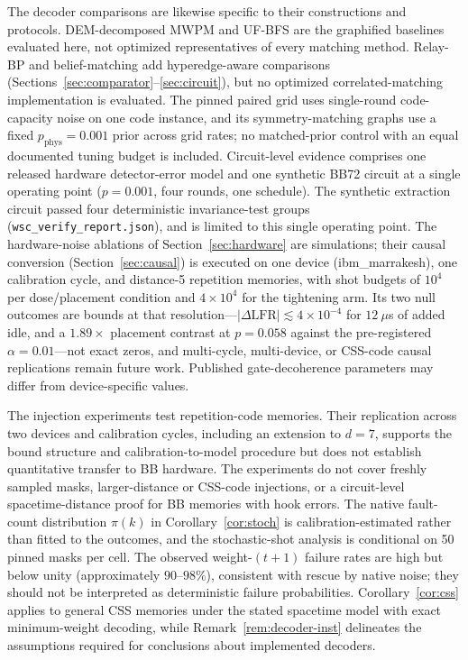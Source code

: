 \documentclass[pdflatex,sn-mathphys-num]{sn-jnl}
\theoremstyle{thmstyleone}
\theoremstyle{thmstyletwo}
\theoremstyle{thmstylethree}
\begin{document}
The decoder comparisons are likewise specific to their constructions and protocols. DEM-decomposed MWPM and UF-BFS are the graphified baselines evaluated here, not optimized representatives of every matching method. Relay-BP and belief-matching add hyperedge-aware comparisons (Sections~\ref{sec:comparator}--\ref{sec:circuit}), but no optimized correlated-matching implementation is evaluated. The pinned paired grid uses single-round code-capacity noise on one code instance, and its symmetry-matching graphs use a fixed $p_{\mathrm{phys}}=0.001$ prior across grid rates; no matched-prior control with an equal documented tuning budget is included. Circuit-level evidence comprises one released hardware detector-error model and one synthetic BB72 circuit at a single operating point ($p=0.001$, four rounds, one schedule). The synthetic extraction circuit passed four deterministic invariance-test groups (\texttt{wsc\_verify\_report.json}), and is limited to this single operating point. The hardware-noise ablations of Section~\ref{sec:hardware} are simulations; their causal conversion (Section~\ref{sec:causal}) is executed on one device (ibm\_marrakesh), one calibration cycle, and distance-5 repetition memories, with shot budgets of $10^{4}$ per dose/placement condition and $4\times10^{4}$ for the tightening arm. Its two null outcomes are bounds at that resolution---$|\Delta\mathrm{LFR}|\lesssim4\times10^{-4}$ for $12~\mu$s of added idle, and a $1.89\times$ placement contrast at $p=0.058$ against the pre-registered $\alpha=0.01$---not exact zeros, and multi-cycle, multi-device, or CSS-code causal replications remain future work. Published gate-decoherence parameters may differ from device-specific values.

The injection experiments test repetition-code memories. Their replication across two devices and calibration cycles, including an extension to $d=7$, supports the bound structure and calibration-to-model procedure but does not establish quantitative transfer to BB hardware. The experiments do not cover freshly sampled masks, larger-distance or CSS-code injections, or a circuit-level spacetime-distance proof for BB memories with hook errors. The native fault-count distribution $\pi(k)$ in Corollary~\ref{cor:stoch} is calibration-estimated rather than fitted to the outcomes, and the stochastic-shot analysis is conditional on 50 pinned masks per cell. The observed weight-$(t+1)$ failure rates are high but below unity (approximately $90$--$98\%$), consistent with rescue by native noise; they should not be interpreted as deterministic failure probabilities. Corollary~\ref{cor:css} applies to general CSS memories under the stated spacetime model with exact minimum-weight decoding, while Remark~\ref{rem:decoder-inst} delineates the assumptions required for conclusions about implemented decoders.
\end{document}
